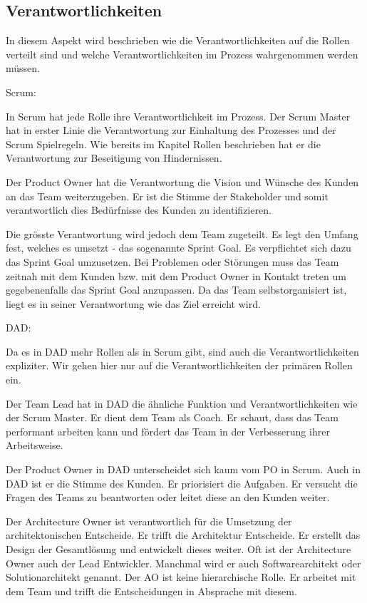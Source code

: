 \subsection{Verantwortlichkeiten}

In diesem Aspekt wird beschrieben wie die Verantwortlichkeiten auf die Rollen verteilt sind und welche Verantwortlichkeiten im Prozess wahrgenommen werden müssen.

{\Large Scrum:} \medskip

In Scrum hat jede Rolle ihre Verantwortlichkeit im Prozess. Der Scrum Master hat in erster Linie die Verantwortung zur Einhaltung des Prozesses und der Scrum Spielregeln. Wie bereits im Kapitel Rollen beschrieben hat er die Verantwortung zur Beseitigung von Hindernissen.

Der Product Owner hat die Verantwortung die Vision und Wünsche des Kunden an das Team weiterzugeben. Er ist die Stimme der Stakeholder und somit verantwortlich dies Bedürfnisse des Kunden zu identifizieren.

Die grösste Verantwortung wird jedoch dem Team zugeteilt. Es legt den Umfang fest, welches es umsetzt - das sogenannte Sprint Goal. Es verpflichtet sich dazu das Sprint Goal umzusetzen. Bei Problemen oder Störungen muss das Team zeitnah mit dem Kunden bzw. mit dem Product Owner in Kontakt treten um gegebenenfalls das Sprint Goal anzupassen. Da das Team selbstorganisiert ist, liegt es in seiner Verantwortung wie das Ziel erreicht wird.

\smallskip
{\Large DAD:} \medskip

Da es in DAD mehr Rollen als in Scrum gibt, sind auch die Verantwortlichkeiten expliziter.
Wir gehen hier nur auf die Verantwortlichkeiten der primären Rollen ein.

Der Team Lead hat in DAD die ähnliche Funktion und Verantwortlichkeiten wie der Scrum Master. Er dient dem Team als Coach. Er schaut, dass das Team performant arbeiten kann und fördert das Team in der Verbesserung ihrer Arbeitsweise.

Der Product Owner in DAD unterscheidet sich kaum vom PO in Scrum. Auch in DAD ist er die Stimme des Kunden. Er priorisiert die Aufgaben. Er versucht die Fragen des Teams zu beantworten oder leitet diese an den Kunden weiter.

Der Architecture Owner ist verantwortlich für die Umsetzung der architektonischen Entscheide. Er trifft die Architektur Entscheide. Er erstellt das Design der Gesamtlösung und entwickelt dieses weiter. Oft ist der Architecture Owner auch der Lead Entwickler. Manchmal wird er auch Softwarearchitekt oder Solutionarchitekt genannt. Der AO ist keine hierarchische Rolle. Er arbeitet mit dem Team und trifft die Entscheidungen in Absprache mit diesem.

